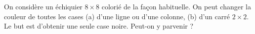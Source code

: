 On considère un échiquier $8 \times 8$ colorié de la façon habituelle. On peut changer la couleur de toutes les cases (a) d'une ligne ou d'une colonne, (b) d'un carré $2 \times 2$. Le but est d'obtenir une seule case noire. Peut-on y parvenir ?
